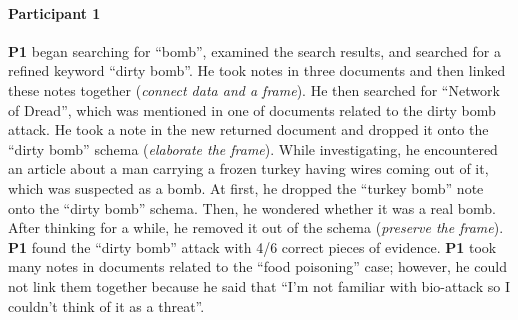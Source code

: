 \paragraph{Participant 1}
\textbf{P1} began searching for ``bomb'', examined the search results, and searched for  a refined keyword ``dirty bomb''. He took notes in three documents and then linked these notes together (\emph{connect data and a frame}). He then searched for ``Network of Dread'', which was mentioned in one of documents related to the dirty bomb attack. He took a note in the new returned document and dropped it onto the ``dirty bomb'' schema (\emph{elaborate the frame}). While investigating, he encountered an article about a man carrying a frozen turkey having wires coming out of it, which was suspected as a bomb. At first, he dropped the ``turkey bomb'' note onto the ``dirty bomb'' schema. Then, he wondered whether it was a real bomb. After thinking for a while, he removed it out of the schema (\emph{preserve the frame}). \textbf{P1} found the ``dirty bomb'' attack with 4/6 correct pieces of evidence. \textbf{P1} took many notes in documents related to the ``food poisoning'' case; however, he could not link them together because he said that ``I'm not familiar with bio-attack so I couldn't think of it as a threat''. 

